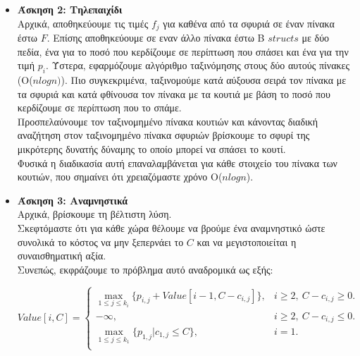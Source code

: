 \documentclass[12pt]{article}
\begin{document}
\begin{itemize}[label=$\blacktriangleright$]
\item \textbf{Άσκηση 2: Τηλεπαιχίδι}\\
\hfill \break
Αρχικά, αποθηκεύουμε τις τιμές $f_j$ για καθένα από τα σφυριά σε έναν πίνακα έστω $F$. Επίσης αποθηκεύουμε σε εναν άλλο πίνακα έστω Β $structs$ με δύο πεδία, ένα για το ποσό που κερδίζουμε σε περίπτωση που σπάσει και ένα για την τιμή $p_i$. Ύστερα, εφαρμόζουμε αλγόριθμο ταξινόμησης στους δύο αυτούς πίνακες (O($nlogn)$). Πιο συγκεκριμένα, ταξινομούμε κατά αύξουσα σειρά τον πίνακα με τα σφυριά και κατά φθίνουσα τον πίνακα με τα κουτιά με βάση το ποσό που κερδίζουμε σε περίπτωση που το σπάμε. \\
Προσπελαύνουμε τον ταξινομημένο πίνακα κουτιών και κάνοντας διαδική αναζήτηση στον ταξινομημένο πίνακα σφυριών βρίσκουμε το σφυρί της μικρότερης δυνατής δύναμης το οποίο μπορεί να σπάσει το κουτί.\\ Φυσικά η διαδικασία αυτή επαναλαμβάνεται για κάθε στοιχείο του πίνακα των κουτιών, που σημαίνει ότι χρειαζόμαστε χρόνο Ο($nlogn$).\\
\item \textbf{Άσκηση 3: Αναμνηστικά}\\
Αρχικά, βρίσκουμε τη βέλτιστη λύση.\\
Σκεφτόμαστε ότι για κάθε χώρα θέλουμε να βρούμε ένα αναμνηστικό ώστε συνολικά το κόστος να μην ξεπερνάει το $C$ και να μεγιστοποιείται η συναισθηματική αξία.\\
Συνεπώς, εκφράζουμε το πρόβλημα αυτό αναδρομικά ως εξής:
\begin{center}
\begin{equation}
 Value[i,C]=
 \begin{cases}
    \max\limits_{1 \leq j \leq k_i}\{p_{i,j}+Value[i-1,C-c_{i,j}]\}, & \text{$i\geq2,\ C-c_{i,j}\geq0$}.\\
    -\infty, & \text{$i\geq2,\ C-c_{i,j}\leq0$}.\\
    \max\limits_{1 \leq j \leq k_1}\{p_{1,j}| c_{1,j}\leq C\}, & \text{$i=1$}.\\
  \end{cases}
\end{equation}
\end{center}


\end{itemize}
\end{document}
